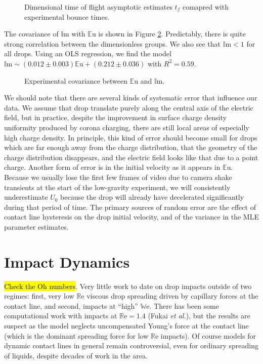\documentclass[12pt,a4paper,oneside]{book}
\begin{document}
\begin{figure}[h]
    \centering
    
    \caption{Dimensional time of flight asymptotic estimates $t_f$ comapred with experimental bounce times.\label{fig:series_s_ds}}
\end{figure}

The covariance of $\mathbb{I}\mbox{m}$ with $\mathbb{E}\mbox{u}$ is shown in Figure \ref{fig:dnumbs}. Predictably, there is quite strong correlation between the dimensionless groups. We also see that $\mathbb{I}\mbox{m} < 1$ for all drops. Using an OLS regression, we find the model $\mathbb{I}\mbox{m} \sim (0.012 \pm 0.003) \mathbb{E}\mbox{u} + (0.212 \pm 0.036) $ with $R^2 =0.59$.
\begin{figure}[h]
    \centering
    
    \caption{Experimental covariance between $\mathbb{E}\mbox{u}$ and $\mathbb{I}\mbox{m}$.\label{fig:dnumbs}}
\end{figure}

We should note that there are several kinds of systematic error that influence our data. We assume that drop translate purely along the central axis of the electric field, but in practice, despite the improvement in surface charge density uniformity produced by corona charging, there are still local areas of especially high charge density. In principle, this kind of error should become small for drops which are far enough away from the charge distribution, that the geometry of the charge distribution disappears, and the electric field looks like that due to a point charge. Another form of error is in the initial velocity as it appears in $\mathbb{E}\mbox{u}$. Because we usually lose the first few frames of video due to camera shake transients at the start of the low-gravity experiment, we will consistently underestimate $U_0$ because the drop will already have decelerated significantly during that period of time. The primary sources of random error are the effect of contact line hysteresis on the drop initial velocity, and of the variance in the MLE parameter estimates.

\section{Impact Dynamics}
\hl{Check the Oh numbers}. Very little work to date on drop impacts outside of two regimes: first, very low $\mathbb{R}\mbox{e}$ viscous drop spreading driven by capillary forces at the contact line, and second, impacts at ``high'' $\mathbb{W}\mbox{e}$. There has been some computational work with impacts at $\mathbb{R}\mbox{e}=1.4$ (Fukai \emph{et al.}), but the results are suspect as the model neglects uncompensated Young's force at the contact line (which is the dominant spreading force for low $\mathbb{R}\mbox{e}$ impacts). Of course models for dynamic contact lines in general remain controversial, even for ordinary spreading of liquids, despite decades of work in the area. 
\end{document}
